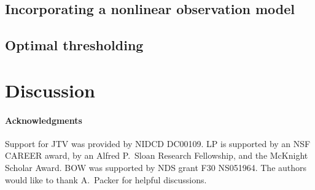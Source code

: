 \subsection{Incorporating a nonlinear observation model}

\subsection{Optimal thresholding}

\newpage
\section{Discussion}


\paragraph{Acknowledgments}

Support for JTV was provided by NIDCD DC00109. LP is supported by an NSF CAREER award, by an Alfred P.\ Sloan Research Fellowship, and the McKnight Scholar Award. BOW was supported by NDS grant F30 NS051964. The authors would like to thank A.\ Packer for helpful discussions.


%

%
%


\appendix


